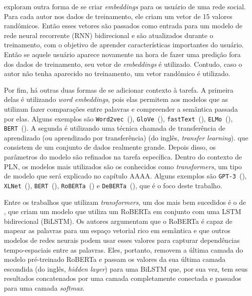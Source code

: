 \cite{kolchinski-potts:2018:representing-social-media-users} exploram outra
forma de se criar \textit{embeddings} para os usuário de uma rede social. Para
cada autor nos dados de treinamento, ele criam um vetor de 15 valores
randômicos. Então esses vetores são passados como entrada para um modelo de rede
neural recorrente (RNN) bidirecional e são atualizados durante o treinamento,
com o objetivo de aprender características importantes do usuário. Então se
aquele usuário aparece novamente na hora de fazer uma predição fora dos dados de
treinamento, seu vetor de \textit{embeddings} é utilizado. Contudo, caso o autor
não tenha aparecido no treinamento, um vetor randômico é utilizado.

Por fim, há outras duas formas de se adicionar contexto à tarefa. A primeira
delas é utilizando \textit{word embeddings}, pois elas permitem aos modelos que
as utilizam fazer comparações entre palavras e compreender a semântica passada
por elas. Alguns exemplos são
\texttt{Word2vec}~(\cite{mikolov-etal:2013:word2vec}),
\texttt{GloVe}~(\cite{pennington-etal:2014:glove}),
\texttt{fastText}~(\cite{bojanowski-etal:2016:fasttext}),
\texttt{ELMo}~(\cite{peters-etal:2018:elmo}),
\texttt{BERT}~(\cite{devlin-etal:2018:bert}).
A segunda é utilizando uma técnica chamada de transferência de aprendizado (ou
aprendizado por transferência) (do inglês, \textit{transfer learning}).
que consistem de um conjunto de dados realmente grande. Depois disso, os
parâmetros do modelo são refinados na tarefa específica. Dentro do contexto de
PLN, os modelos mais utilizados são os conhecidos como \textit{transformers},
um tipo de modelo que será explicado no capítulo AAAA. Alguns exemplos são
\texttt{GPT-3}~(\cite{brown-etal:2020:gpt3}),
\texttt{XLNet}~(\cite{yang-etal:2019:xlnet}),
\texttt{BERT}~(\cite{devlin-etal:2018:bert}),
\texttt{RoBERTa}~(\cite{liu-etal:2019:roberta})
e \texttt{DeBERTa}~(\cite{he-etal:2020:deberta}), que é o foco deste trabalho.

Entre os trabalhos que utilizam \textit{transformers}, um dos mais bem sucedidos
é o de \cite{potamias-etal:2020:transform-sarcasm}, que criam um modelo que
utiliza um RoBERTa em conjunto com uma LSTM bidirecional (BiLSTM). Os autores
argumentam que o RoBERTa é capaz de mapear as palavras para um espaço vetorial
rico em semântica e que outros modelos de redes neurais podem usar esses valores
para capturar dependências tempo-espaciais entre as palavras. Eles, portanto,
removem a última camada do modelo pré-treinado RoBERTa e passam os valores da
sua última camada escondida (do inglês, \textit{hidden layer}) para uma BiLSTM
que, por sua vez, tem seus resultados concatenados por uma camada completamente
conectada e passados para uma camada \textit{softmax}.


